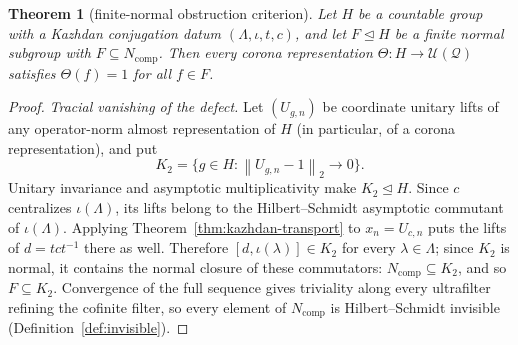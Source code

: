 \documentclass[11pt]{amsart}
\newcommand{\leanverified}[2]{\ignorespaces}
\newtheorem{theorem}{Theorem}[section]
\theoremstyle{definition}
\theoremstyle{remark}
\theoremstyle{plain}
\newcommand{\U}{\mathcal U}
\newcommand{\hsnorm}[1]{\left\lVert #1\right\rVert_{2}}
\begin{document}
\begin{theorem}[finite-normal obstruction criterion]\label{thm:criterion}
Let $H$ be a countable group with a Kazhdan conjugation datum
$(\Lambda,\iota,t,c)$, and let $F\trianglelefteq H$ be a finite
normal subgroup with $F\subseteq N_{\mathrm{comp}}$.  Then every
corona representation $\Theta\colon H\to\U(\mathcal Q)$ satisfies
$\Theta(f)=1$ for all $f\in F$.
\leanverified{Sofic/ManuscriptExactWrappers}{GroupApproximation.ManuscriptExactWrappers.manuscriptFiniteNormalObstructionCriterion}
\end{theorem}

\begin{proof}
\emph{Tracial vanishing of the defect.}  Let $(U_{g,n})$ be
coordinate unitary lifts of any operator-norm almost representation of
$H$ (in particular, of a corona representation), and put
\[
  K_2=\{g\in H:\hsnorm{U_{g,n}-1}\longrightarrow0\}.
\]
Unitary invariance and asymptotic multiplicativity make
$K_2\trianglelefteq H$.  Since $c$ centralizes $\iota(\Lambda)$, its
lifts belong to the Hilbert--Schmidt asymptotic commutant of
$\iota(\Lambda)$.  Applying Theorem~\ref{thm:kazhdan-transport} to
$x_n=U_{c,n}$ puts the lifts of $d=tct^{-1}$ there as well.  Therefore
$[d,\iota(\lambda)]\in K_2$ for every $\lambda\in\Lambda$; since
$K_2$ is normal, it contains the normal closure of these commutators:
$N_{\mathrm{comp}}\subseteq K_2$, and so $F\subseteq K_2$.
Convergence of the full sequence gives triviality along every
ultrafilter refining the cofinite filter, so every element of
$N_{\mathrm{comp}}$ is Hilbert--Schmidt invisible
(Definition~\ref{def:invisible}).


\end{proof}
\end{document}
